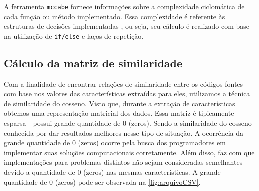 %	
	
			A ferramenta \texttt{mccabe} \cite{mccabe2013} fornece informações sobre a
			complexidade ciclomática \cite{mccabe} de cada função ou método implementado.
			Essa complexidade é referente às estruturas de decisões implementadas \cite{mccabe},
			ou seja, seu cálculo é realizado com base na utilização de \texttt{if/else} e laços
			de repetição.
			
		
		\subsection{Cálculo da matriz de similaridade}
			Com a finalidade de encontrar relações de similaridade entre os códigos-fontes
			com base nos valores das características extraídas para eles, utilizamos a
			técnica de similaridade do cosseno. Visto que, durante a extração de
			características obtemos uma representação matricial dos dados. Essa matriz é
			tipicamente esparsa - possui grande quantidade de 0 (zeros). Sendo a
			similaridade do cosseno conhecida por dar resultados melhores nesse tipo de
			situação. A ocorrência da grande quantidade de 0 (zeros) ocorre pela busca
			dos programadores em implementar suas soluções computacionais corretamente.
			Além disso, faz com que implementações para problemas distintos não sejam
			consideradas semelhantes devido a quantidade de 0 (zeros) nas mesmas
			características. A grande quantidade de 0 (zeros) pode ser observada na
			\cref{fig:arquivoCSV}.
		
